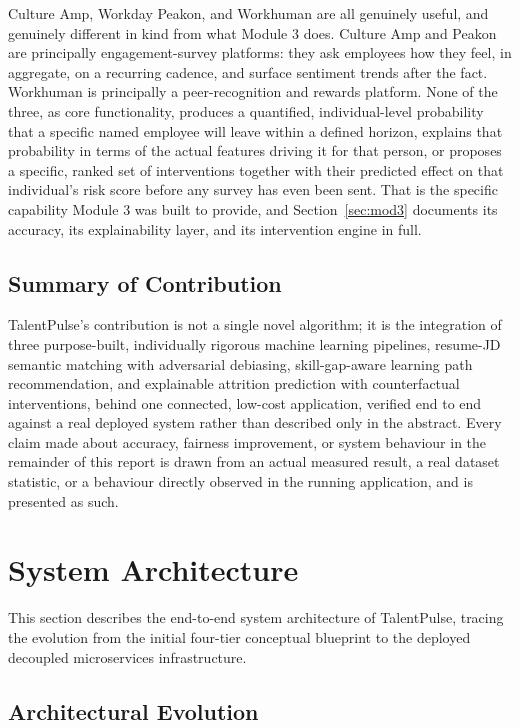 \documentclass[11pt,a4paper]{article}
\begin{document}
Culture Amp, Workday Peakon, and Workhuman are all genuinely useful, and genuinely different in kind from what Module 3 does. Culture Amp and Peakon are principally engagement-survey platforms: they ask employees how they feel, in aggregate, on a recurring cadence, and surface sentiment trends after the fact. Workhuman is principally a peer-recognition and rewards platform. None of the three, as core functionality, produces a quantified, individual-level probability that a specific named employee will leave within a defined horizon, explains that probability in terms of the actual features driving it for that person, or proposes a specific, ranked set of interventions together with their predicted effect on that individual's risk score before any survey has even been sent. That is the specific capability Module 3 was built to provide, and Section~\ref{sec:mod3} documents its accuracy, its explainability layer, and its intervention engine in full.

\subsection{Summary of Contribution}

TalentPulse's contribution is not a single novel algorithm; it is the integration of three purpose-built, individually rigorous machine learning pipelines, resume-JD semantic matching with adversarial debiasing, skill-gap-aware learning path recommendation, and explainable attrition prediction with counterfactual interventions, behind one connected, low-cost application, verified end to end against a real deployed system rather than described only in the abstract. Every claim made about accuracy, fairness improvement, or system behaviour in the remainder of this report is drawn from an actual measured result, a real dataset statistic, or a behaviour directly observed in the running application, and is presented as such.

\clearpage
\section{System Architecture}
\label{sec:arch}

This section describes the end-to-end system architecture of TalentPulse, tracing the evolution from the initial four-tier conceptual blueprint to the deployed decoupled microservices infrastructure.

\subsection{Architectural Evolution}
\end{document}
